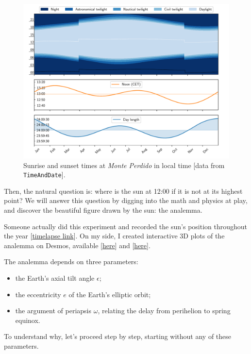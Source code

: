 \documentclass[12pt]{article}
\begin{document}
\begin{figure}[ht]
    \centering
    \includegraphics[width=\textwidth]{./figures/sun_graph.pdf}
    \caption{
        Sunrise and sunset times at \textit{Monte Perdido} in local 
        time [data from \texttt{TimeAndDate}].
    }
    \label{fig:sunrise_sunset}
\end{figure}

Then, the natural question is: where is the sun at 12:00 if it is not at its 
highest point? We will answer this question by digging into the math and physics
at play, and discover the beautiful figure drawn by the sun: the analemma.

Someone actually did this experiment and recorded the sun's position
throughout the year 
[\href{https://www.youtube.com/watch?v=Deli5COMJhs}{timelapse link}].
On my side, I created interactive 3D plots of the analemma on Desmos, available
[\href{https://www.desmos.com/3d/1zuaedwwnz}{here}] and 
[\href{https://www.desmos.com/3d/dktrfjpwnh}{here}].


\newpage
The analemma depends on three parameters:
\begin{itemize}
    \item the Earth's axial tilt angle $\epsilon$;
    \item the eccentricity $e$ of the Earth's elliptic orbit;
    \item the argument of periapsis $\omega$, relating the delay 
    from perihelion to spring equinox.
\end{itemize}
To understand why, let's proceed step by step, starting without any of these
parameters.
\end{document}
